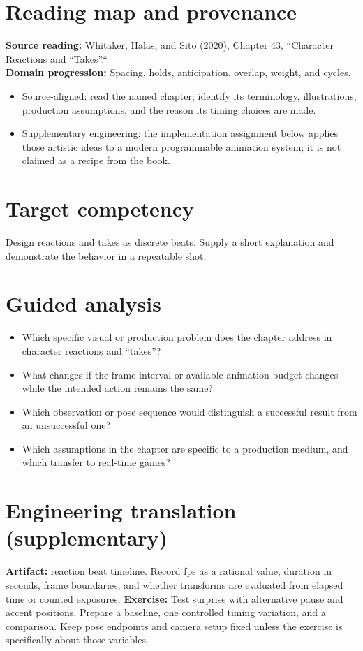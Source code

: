 \documentclass[10pt,letterpaper]{article}
\begin{document}
\makedoctitle
\makedocsummary

\section{Reading map and provenance}
\textbf{Source reading:} Whitaker, Halas, and Sito (2020), Chapter 43, ``Character Reactions and “Takes”.``\\
\textbf{Domain progression:} Spacing, holds, anticipation, overlap, weight, and cycles.
\begin{itemize}
\item Source-aligned: read the named chapter; identify its terminology, illustrations, production assumptions, and the reason its timing choices are made.
\item Supplementary engineering: the implementation assignment below applies those artistic ideas to a modern programmable animation system; it is not claimed as a recipe from the book.
\end{itemize}
\section{Target competency}
Design reactions and takes as discrete beats. Supply a short explanation and demonstrate the behavior in a repeatable shot.
\section{Guided analysis}
\begin{itemize}
\item Which specific visual or production problem does the chapter address in character reactions and “takes”?
\item What changes if the frame interval or available animation budget changes while the intended action remains the same?
\item Which observation or pose sequence would distinguish a successful result from an unsuccessful one?
\item Which assumptions in the chapter are specific to a production medium, and which transfer to real-time games?
\end{itemize}
\section{Engineering translation (supplementary)}
\textbf{Artifact:} reaction beat timeline. Record fps as a rational value, duration in seconds, frame boundaries, and whether transforms are evaluated from elapsed time or counted exposures.
\textbf{Exercise:} Test surprise with alternative pause and accent positions. Prepare a baseline, one controlled timing variation, and a comparison. Keep pose endpoints and camera setup fixed unless the exercise is specifically about those variables.
\end{document}
